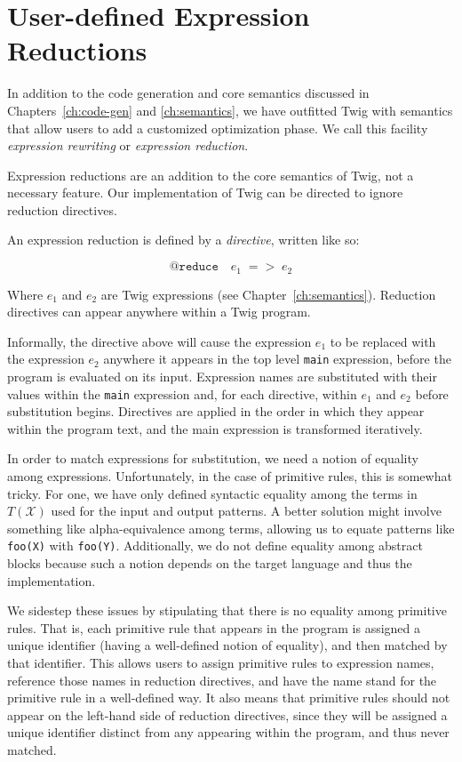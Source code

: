 
\chapter{User-defined Expression Reductions}
\label{ch:reductions}

In addition to the code generation and core semantics discussed in
Chapters~\ref{ch:code-gen} and \ref{ch:semantics}, we have
outfitted Twig with semantics that allow users to add a customized
optimization phase. We call this facility \emph{expression
rewriting} or \emph{expression reduction}.

Expression reductions are an addition to the core semantics of
Twig, not a necessary feature. Our implementation of Twig can be
directed to ignore reduction directives.

An expression reduction is defined by a \emph{directive}, written
like so:

\[
\mathtt{@reduce}\quad e_1 \;\mathtt{=>}\; e_2
\]

Where $e_1$ and $e_2$ are Twig expressions (see
Chapter~\ref{ch:semantics}). Reduction directives can appear
anywhere within a Twig program.

Informally, the directive above will cause the expression $e_1$ to
be replaced with the expression $e_2$ anywhere it appears in the
top level \texttt{main} expression, before the program is
evaluated on its input. Expression names are substituted with
their values within the \texttt{main} expression and, for each
directive, within $e_1$ and $e_2$ before substitution begins.
Directives are applied in the order in which they appear within
the program text, and the main expression is transformed
iteratively.

In order to match expressions for substitution, we need a notion
of equality among expressions. Unfortunately, in the case of
primitive rules, this is somewhat tricky. For one, we have only
defined syntactic equality among the terms in $T(\mathcal{X})$
used for the input and output patterns. A better solution might
involve something like alpha-equivalence among terms, allowing us
to equate patterns like \texttt{foo(X)} with \texttt{foo(Y)}.
Additionally, we do not define equality among abstract blocks
because such a notion depends on the target language and thus the
implementation. 

We sidestep these issues by stipulating that there is no equality
among primitive rules. That is, each primitive rule that appears
in the program is assigned a unique identifier (having a
well-defined notion of equality), and then matched by that
identifier. This allows users to assign primitive rules to
expression names, reference those names in reduction directives,
and have the name stand for the primitive rule in a well-defined
way. It also means that primitive rules should not appear on the
left-hand side of reduction directives, since they will be
assigned a unique identifier distinct from any appearing within
the program, and thus never matched.

